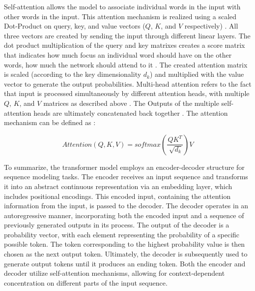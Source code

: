 Self-attention allows the model to associate individual words in the input with other words in the input.
This attention mechanism is realized using a scaled Dot-Product on query, key, and value vectors ($Q$, $K$, and $V$ respectively) \cite{vaswani2017AttentionAllYou}.
All three vectors are created by sending the input through different linear layers.
The dot product multiplication of the query and key matrixes creates a score matrix that indicates how much focus an individual word should have on the other words, \ie how much the network should attend to it \cite{vaswani2017AttentionAllYou}.
The created attention matrix is scaled (according to the key dimensionality $d_k$) and multiplied with the value vector to generate the output probabilities.
Multi-head attention refers to the fact that input is processed simultaneously by different attention heads, \ie with multiple $Q$, $K$, and $V$ matrices as described above \cite{vaswani2017AttentionAllYou}.
The Outputs of the multiple self-attention heads are ultimately concatenated back together \cite{vaswani2017AttentionAllYou}.
The attention mechanism can be defined as \cite[p.4]{vaswani2017AttentionAllYou}:

\begin{equation}
  \label{eqn:attention}
  Attention(Q,K,V)=softmax(\frac{QK^T}{\sqrt[]{d_k}})V
\end{equation}

To summarize, the transformer model employs an encoder-decoder structure for sequence modeling tasks. 
The encoder receives an input sequence and transforms it into an abstract continuous representation via an embedding layer, which includes positional encodings. 
This encoded input, containing the attention information from the input, is passed to the decoder. 
The decoder operates in an autoregressive manner, incorporating both the encoded input and a sequence of previously generated outputs in its process. 
The output of the decoder is a probability vector, with each element representing the probability of a specific possible token.
The token corresponding to the highest probability value is then chosen as the next output token.
Ultimately, the decoder is subsequently used to generate output tokens until it produces an ending token.
Both the encoder and decoder utilize self-attention mechanisms, allowing for context-dependent concentration on different parts of the input sequence.


